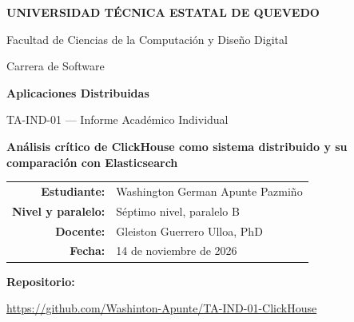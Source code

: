 \documentclass[12pt,a4paper]{article}
\begin{document}
\begin{titlepage}
  \centering
  {\large\bfseries UNIVERSIDAD TÉCNICA ESTATAL DE QUEVEDO\par}
  \vspace{0.3cm}
  {\large Facultad de Ciencias de la Computación y Diseño Digital\par}
  \vspace{0.2cm}
  {\large Carrera de Software\par}
  \vspace{1.5cm}
  {\Large\bfseries Aplicaciones Distribuidas\par}
  \vspace{0.4cm}
  {\large TA-IND-01 — Informe Académico Individual\par}
  \vspace{1.5cm}
  {\LARGE\bfseries Análisis crítico de ClickHouse como sistema distribuido y su comparación con Elasticsearch\par}
  \vfill
  \begin{tabular}{rl}
    \textbf{Estudiante:} & Washington German Apunte Pazmiño \\
    \textbf{Nivel y paralelo:} & Séptimo nivel, paralelo B \\
    \textbf{Docente:} & Gleiston Guerrero Ulloa, PhD \\
    \textbf{Fecha:} & 14 de noviembre de 2026 \\
  \end{tabular}
  \par\vspace{1cm}
  \textbf{Repositorio:}\par
  \url{https://github.com/Washinton-Apunte/TA-IND-01-ClickHouse}
\end{titlepage}
\end{document}
